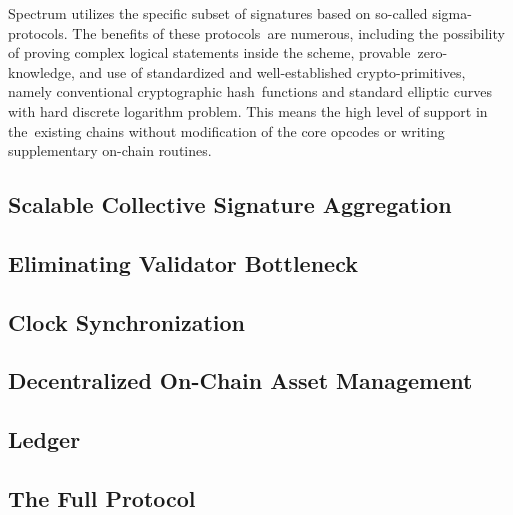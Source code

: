Spectrum utilizes the specific subset of signatures based on so-called sigma-protocols.
The benefits of these protocols\
are numerous, including the possibility of proving complex logical statements inside the scheme, provable\
zero-knowledge, and use of standardized and well-established crypto-primitives, namely conventional cryptographic hash\
functions and standard elliptic curves with hard discrete logarithm problem.
This means the high level of support in the\
existing chains without modification of the core opcodes or writing supplementary on-chain routines.

\subsection{Scalable Collective Signature Aggregation}\label{subsec:scalable-collective-signature-aggregation}


\subsection{Eliminating Validator Bottleneck}\label{subsec:eliminating-validator-bottleneck}


\subsection{Clock Synchronization}\label{subsec:clock-sync}


\subsection{Decentralized On-Chain Asset Management}\label{subsec:decentralized-on-chain-asset-management}


\subsection{Ledger}\label{subsec:ledger-model}


\subsection{The Full Protocol}\label{subsec:protocol-flow}

